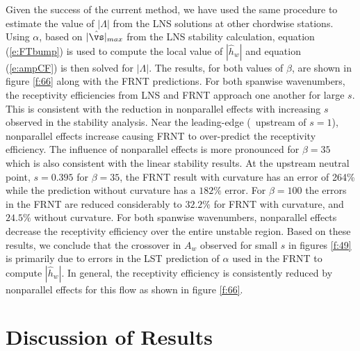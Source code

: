 Given the success of the current method, we have used the same procedure to
estimate the value of $|\Lambda|$ from the LNS solutions at other chordwise
stations.  Using $\alpha$, based on $|\hat\vs|_{max}$ from the LNS stability
calculation, equation (\ref{e:FTbump}) is used to compute the local value of
$|\hat h_w|$ and equation (\ref{e:ampCF}) is then solved for $|\Lambda|$.  The
results, for both values of $\beta$, are shown in figure \ref{f:66} along with
the FRNT predictions.  For both spanwise wavenumbers, the receptivity
efficiencies from LNS and FRNT approach one another for large $s$.  This is
consistent with the reduction in nonparallel effects with increasing $s$
observed in the stability analysis.  Near the leading-edge (\ie\ upstream of
$s=1$), nonparallel effects increase causing FRNT to over-predict the
receptivity efficiency.  The influence of nonparallel effects is more
pronounced for $\beta=35$ which is also consistent with the linear stability
results.  At the upstream neutral point, $s=0.395$ for $\beta=35$, the FRNT
result with curvature has an error of 264\% while the prediction without
curvature has a $182\%$ error.  For $\beta=100$ the errors in the FRNT are
reduced considerably to $32.2\%$ for FRNT with curvature, and $24.5\%$ without
curvature.  For both spanwise wavenumbers, nonparallel effects decrease the
receptivity efficiency over the entire unstable region.  Based on these
results, we conclude that the crossover in $A_w$ observed for small $s$ in
figures \ref{f:49} is primarily due to errors in the LST prediction of
$\alpha$ used in the FRNT to compute $|\hat h_w|$.  In general, the
receptivity efficiency is consistently reduced by nonparallel effects for this
flow as shown in figure \ref{f:66}.
%
%
%
%
%
%

\section{Discussion of Results \label{s:discussion} }

